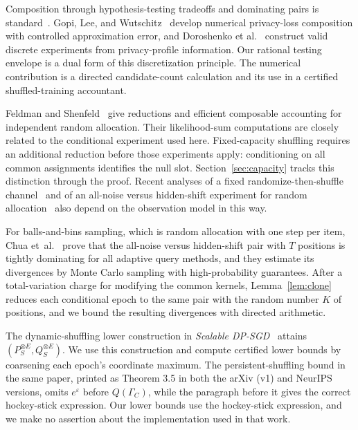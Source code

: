 \documentclass[conference]{IEEEtran}
\newcommand{\eps}{\varepsilon}
\begin{document}
Composition through hypothesis-testing tradeoffs and dominating pairs is standard~\cite{gdp,zhu}. Gopi, Lee, and Wutschitz~\cite{glw} develop numerical privacy-loss composition with controlled approximation error, and Doroshenko et al.~\cite{dots} construct valid discrete experiments from privacy-profile information. Our rational testing envelope is a dual form of this discretization principle. The numerical contribution is a directed candidate-count calculation and its use in a certified shuffled-training accountant.

Feldman and Shenfeld~\cite{fs2025,fs2026} give reductions and efficient composable accounting for independent random allocation. Their likelihood-sum computations are closely related to the conditional experiment used here. Fixed-capacity shuffling requires an additional reduction before those experiments apply: conditioning on all common assignments identifies the null slot. Section~\ref{sec:capacity} tracks this distinction through the proof. Recent analyses of a fixed randomize-then-shuffle channel~\cite{takagi} and of an all-noise versus hidden-shift experiment for random allocation~\cite{vandijk} also depend on the observation model in this way.

For balls-and-bins sampling, which is random allocation with one step per item, Chua et~al.~\cite{ballsbins} prove that the all-noise versus hidden-shift pair with $T$ positions is tightly dominating for all adaptive query methods, and they estimate its divergences by Monte Carlo sampling with high-probability guarantees. After a total-variation charge for modifying the common kernels, Lemma~\ref{lem:clone} reduces each conditional epoch to the same pair with the random number $K$ of positions, and we bound the resulting divergences with directed arithmetic.

The dynamic-shuffling lower construction in \emph{Scalable DP-SGD}~\cite[Sec.~3, before Thm.~3.7]{scalable} attains $(P_S^{\otimes E},Q_S^{\otimes E})$. We use this construction and compute certified lower bounds by coarsening each epoch's coordinate maximum. The persistent-shuffling bound in the same paper, printed as Theorem 3.5 in both the arXiv (v1) and NeurIPS versions, omits $e^\eps$ before $Q(\Gamma_C)$, while the paragraph before it gives the correct hockey-stick expression. Our lower bounds use the hockey-stick expression, and we make no assertion about the implementation used in that work.
\end{document}
